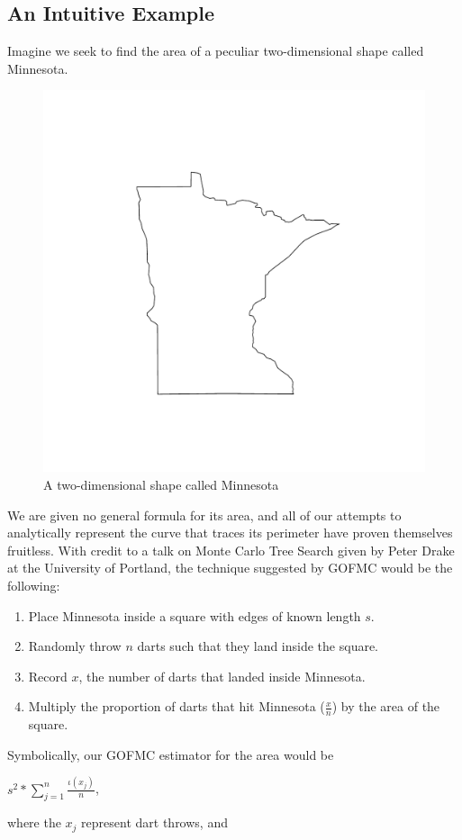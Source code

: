 \documentclass[12pt,twoside]{reedthesis}
\begin{document}
		\subsection*{An Intuitive Example}
		Imagine we seek to find the area of a peculiar two-dimensional shape called Minnesota. 
		\begin{figure}[h]
	       	\centering
	    	\includegraphics[clip=true, viewport=.3in 1in 6in 6in,scale=0.5]{mn}
	     	\caption{A two-dimensional shape called Minnesota}
	 	\label{subd}
		\end{figure}	
		We are given no general formula for its area, and all of our attempts to analytically represent the curve that traces its perimeter have proven themselves fruitless. With credit to a talk on Monte Carlo Tree Search given by Peter Drake at the University of Portland, the technique suggested by GOFMC would be the following:
			\begin{enumerate}
				\item Place Minnesota inside a square with edges of known length $s$.
				\item Randomly throw $n$ darts such that they land inside the square. 
				\item Record $x$, the number of darts that landed inside Minnesota.
				\item Multiply the proportion of darts that hit Minnesota ($\frac{x}{n}$) by the area of the square.
			\end{enumerate}
			Symbolically, our GOFMC estimator for the area would be
			\begin{center}
				${s^2} * \displaystyle\sum_{j=1}^{n}\frac{\iota(x_j)}{n}$,
			\end{center}
			where the $x_j$ represent dart throws, and 
			
\end{document}
